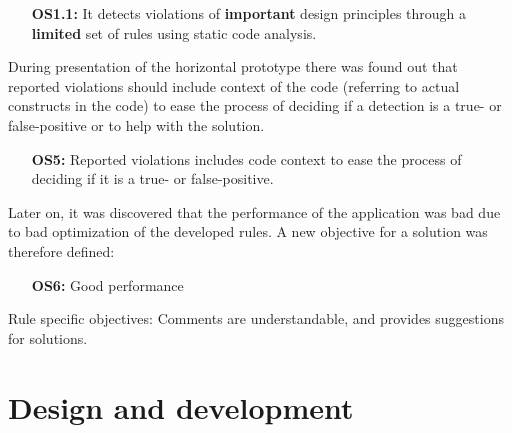 \documentclass{report}
\begin{document}
\begin{itemize}
    \item [\textbf{OS1.1:}] It detects violations of \textbf{important} design principles through a \textbf{limited} set of rules using static code analysis.
\end{itemize}

During presentation of the horizontal prototype there was found out that reported violations should include context of the code (referring to actual constructs in the code) to ease the process of deciding if a detection is a true- or false-positive or to help with the solution. 

\begin{itemize}
        \item [\textbf{OS5:}] Reported violations includes code context to ease the process of deciding if it is a true- or false-positive. 
\end{itemize}

Later on, it was discovered that the performance of the application was bad due to bad optimization of the developed rules. A new objective for a solution was therefore defined:
\begin{itemize}
    \item [\textbf{OS6:}] Good performance
\end{itemize}






Rule specific objectives: 
Comments are understandable, and provides suggestions for solutions.

\section{Design and development}
\label{design-development}
\end{document}
